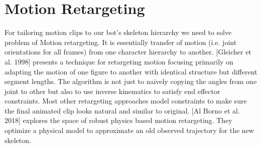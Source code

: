 \section{Motion Retargeting}
For tailoring motion clips to our bot's skeleton hierarchy we need to solve problem of Motion retargeting. It is essentially transfer of motion (i.e. joint orientations for all frames) from one character hierarchy to another. [Gleicher et al. 1998]\cite{Gleicher:1998:RMN:280814.280820} presents a technique for retargeting motion focusing primarily on adapting the motion of one figure to another with identical structure but different segment lengths. The algorithm is not just to naively copying the angles from one joint to other but also to use inverse kinematics to satisfy end effector constraints. Most other retargeting approaches model constraints to make sure the final animated clip looks natural and similar to original. [Al Borno et al. 2018] \cite{al2018robust} explores the space of robust physics based motion retargeting. They optimize a physical model to approximate an old observed trajectory for the new skeleton.  